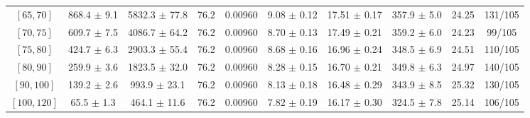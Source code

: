 \begin{tabular}{c||c|c|c|c|c|c|c||c|c}
$[65, 70]$ & 868.4 $\pm$ 9.1 & 5832.3 $\pm$ 77.8 & 76.2 & 0.00960 & 9.08 $\pm$ 0.12 & 17.51 $\pm$ 0.17 & 357.9 $\pm$ 5.0 & 24.25 & 131/105\\
$[70, 75]$ & 609.7 $\pm$ 7.5 & 4086.7 $\pm$ 64.2 & 76.2 & 0.00960 & 8.70 $\pm$ 0.13 & 17.49 $\pm$ 0.21 & 359.2 $\pm$ 6.0 & 24.23 & 99/105\\
$[75, 80]$ & 424.7 $\pm$ 6.3 & 2903.3 $\pm$ 55.4 & 76.2 & 0.00960 & 8.68 $\pm$ 0.16 & 16.96 $\pm$ 0.24 & 348.5 $\pm$ 6.9 & 24.51 & 110/105\\
$[80, 90]$ & 259.9 $\pm$ 3.6 & 1823.5 $\pm$ 32.0 & 76.2 & 0.00960 & 8.28 $\pm$ 0.15 & 16.70 $\pm$ 0.21 & 349.8 $\pm$ 6.3 & 24.97 & 140/105\\
$[90, 100]$ & 139.2 $\pm$ 2.6 & 993.9 $\pm$ 23.1 & 76.2 & 0.00960 & 8.13 $\pm$ 0.18 & 16.48 $\pm$ 0.29 & 343.9 $\pm$ 8.5 & 25.32 & 130/105\\
$[100, 120]$ & 65.5 $\pm$ 1.3 & 464.1 $\pm$ 11.6 & 76.2 & 0.00960 & 7.82 $\pm$ 0.19 & 16.17 $\pm$ 0.30 & 324.5 $\pm$ 7.8 & 25.14 & 106/105\\
\end{tabular}
